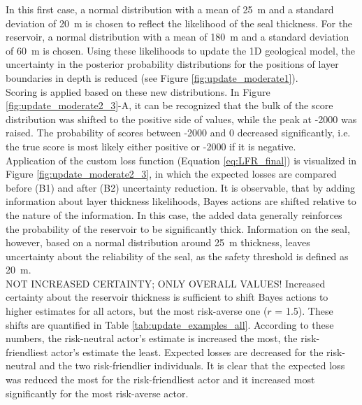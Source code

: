 				In this first case, a normal distribution with a mean of 25~m and a standard deviation of 20~m is chosen to reflect the likelihood of the seal thickness. For the reservoir, a normal distribution with a mean of 180~m and a standard deviation of 60~m is chosen. Using these likelihoods to update the 1D geological model, the uncertainty in the posterior probability distributions for the positions of layer boundaries in depth is reduced (see Figure \ref{fig:update_moderate1}).\\					
				Scoring is applied based on these new distributions. In Figure \ref{fig:update_moderate2_3}-A, it can be recognized that the bulk of the score distribution was shifted to the positive side of values, while the peak at -2000 was raised. The probability of scores between -2000 and 0 decreased significantly, i.e. the true score is most likely either positive or -2000 if it is negative.\\
				Application of the custom loss function (Equation \ref{eq:LFR_final}) is visualized in Figure \ref{fig:update_moderate2_3}, in which the expected losses are compared before (B1) and after (B2) uncertainty reduction. It is observable, that by adding information about layer thickness likelihoods, Bayes actions are shifted relative to the nature of the information. In this case, the added data generally reinforces the probability of the reservoir to be significantly thick. Information on the seal, however, based on a normal distribution around 25~m thickness, leaves uncertainty about the reliability of the seal, as the safety threshold is defined as 20~m.\\				
				NOT INCREASED CERTAINTY; ONLY OVERALL VALUES!
				Increased certainty about the reservoir thickness is sufficient to shift Bayes actions to higher estimates for all actors, but the most risk-averse one ($r$ = 1.5). These shifts are quantified in Table \ref{tab:update_examples_all}. According to these numbers, the risk-neutral actor's estimate is increased the most, the risk-friendliest actor's estimate the least. Expected losses are decreased for the risk-neutral and the two risk-friendlier individuals. It is clear that the expected loss was reduced the most for the risk-friendliest actor and it increased most significantly for the most risk-averse actor.\\				
								

